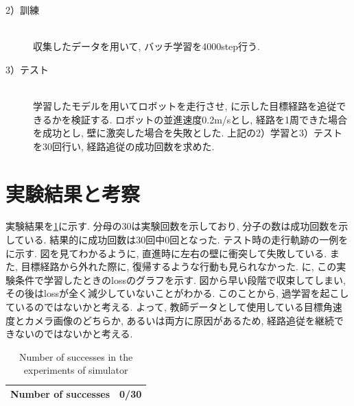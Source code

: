 \newpage
\begin{description}
  \item[2）訓練]\mbox{}\\ \hspace*{3mm}収集したデータを用いて, バッチ学習を4000step行う. 
\end{description}

\begin{description}
  \item[3）テスト]\mbox{}\\ \hspace*{3mm}学習したモデルを用いてロボットを走行させ, に示した目標経路を追従できるかを検証する. ロボットの並進速度0.2m/sとし, 経路を1周できた場合を成功とし, 壁に激突した場合を失敗とした. 上記の2）学習と3）テストを30回行い, 経路追従の成功回数を求めた. 
\end{description}

\section{実験結果と考察}
実験結果を\ref{tb:exp2}に示す. 分母の30は実験回数を示しており, 分子の数は成功回数を示している. 結果的に成功回数は30回中0回となった. テスト時の走行軌跡の一例をに示す. 図を見てわかるように, 直進時に左右の壁に衝突して失敗している. また, 目標経路から外れた際に, 復帰するような行動も見られなかった. に, この実験条件で学習したときのlossのグラフを示す. 図から早い段階で収束してしまい, その後はlossが全く減少していないことがわかる. このことから, 過学習を起こしているのではないかと考える. よって, 教師データとして使用している目標角速度とカメラ画像のどちらか, あるいは両方に原因があるため, 経路追従を継続できないのではないかと考える. 

\begin{table}[h]
  \centering
  \caption{Number of successes in the experiments of simulator}
  \begin{tabular}{|c|c|} \hline
      Number of successes & 0/30 \\ \hline
    \end{tabular}
  \label{tb:exp2}
\end{table}

